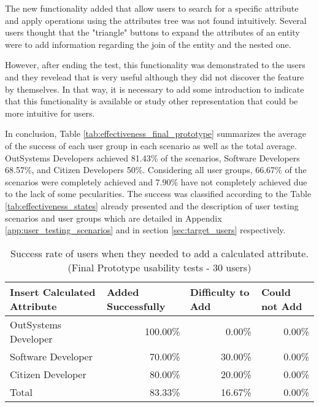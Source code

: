 
The new functionality added that allow users to search for a specific attribute and apply operations using the attributes tree was not found intuitively. Several users thought that the "triangle" buttons to expand the attributes of an entity were to add information regarding the join of the entity and the nested one.

However, after ending the test, this functionality was demonstrated to the users and they revelead that is very useful although they did not discover the feature by themselves. In that way, it is necessary to add some introduction to indicate that this functionality is available or study other representation that could be more intuitive for users.

In conclusion, Table \ref{tab:effectiveness_final_prototype} summarizes the average of the success of each user group in each scenario as well as the total average. OutSystems Developers achieved 81.43\% of the scenarios, Software Developers 68.57\%, and Citizen Developers 50\%. Considering all user groups, 66.67\% of the scenarios were completely achieved and 7.90\% have not completely achieved due to the lack of some pecularities. The success was classified according to the Table \ref{tab:effectiveness_states} already presented and the description of user testing scenarios and user groups which are detailed in Appendix \ref{app:user_testing_scenarios} and in section \ref{sec:target_users} respectively.


\begin{table}[tb]
  \caption{Success rate of users when they needed to add a calculated attribute. (Final Prototype usability tests - 30 users)}
    \label{tab:finalPrototypeCalculatedAttribute}
  \begin{tabular}{@{}lrrr@{}}
  \toprule
  \textbf{Insert Calculated Attribute} & \multicolumn{1}{l}{Added Successfully} & \multicolumn{1}{l}{Difficulty to Add} & \multicolumn{1}{l}{Could not Add} \\ \midrule
  OutSystems Developer                 & 100.00\%                               & 0.00\%                                & 0.00\%                            \\
  Software Developer                   & 70.00\%                                & 30.00\%                               & 0.00\%                            \\
  Citizen Developer                    & 80.00\%                                & 20.00\%                               & 0.00\%                            \\
  Total                                & 83.33\%                                & 16.67\%                               & 0.00\%                            \\ \bottomrule
  \end{tabular}
  \end{table}





